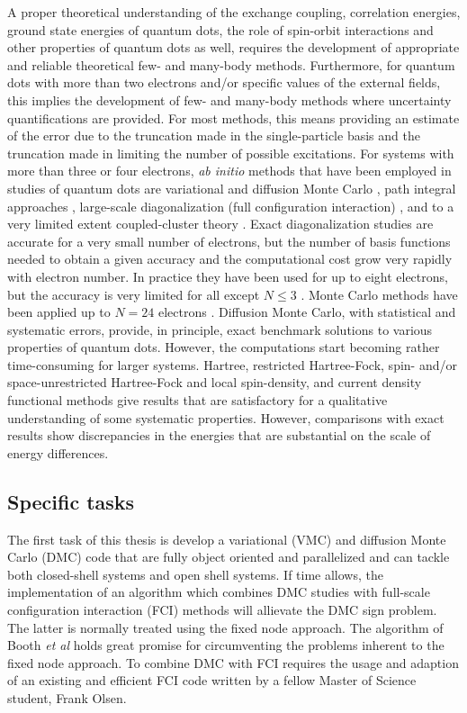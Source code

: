 \documentclass[twocolumn]{revtex4}
\begin{document}
A proper theoretical understanding of the exchange coupling,
correlation energies, ground state energies of quantum dots, the role
of spin-orbit interactions and other properties of quantum dots as
well, requires the development of appropriate and reliable theoretical
few- and many-body methods.  Furthermore, for quantum dots with more
than two electrons and/or specific values of the external fields, this
implies the development of few- and many-body methods where
uncertainty quantifications are provided.  For most methods, this
means providing an estimate of the error due to the truncation made in
the single-particle basis and the truncation made in limiting the
number of possible excitations.  For systems with more than three or
four electrons, {\em ab initio} methods that have been employed in
studies of quantum dots are variational and diffusion Monte Carlo
\cite{harju2005,pederiva2001, pederiva2003}, path integral approaches
\cite{pi1999}, large-scale diagonalization (full configuration
interaction) \cite{Eto97,Maksym90,simen2008,modena2000}, and to a very
limited extent coupled-cluster theory
\cite{shavittbartlett2009,bartlett2007,bartlett2003,indians}.  Exact
diagonalization studies are accurate for a very small number of
electrons, but the number of basis functions needed to obtain a given
accuracy and the computational cost grow very rapidly with electron
number.  In practice they have been used for up to eight
electrons\cite{Eto97,Maksym90,modena2000}, but the accuracy is very
limited for all except $N\le 3$ .  Monte Carlo methods have been
applied up to $N=24$ electrons
\cite{pederiva2001,pederiva2003}. Diffusion Monte Carlo, with
statistical and systematic errors, provide, in principle, exact
benchmark solutions to various properties of quantum dots. However,
the computations start becoming rather time-consuming for larger
systems.  Hartree\cite{Kum90}, restricted Hartree-Fock, spin- and/or
space-unrestricted Hartree-Fock\cite{Fuj96,Mul96,Yan99} and local
spin-density, and current density functional
methods\cite{Kos97,Hir99,finns1,finns2} give results that are
satisfactory for a qualitative understanding of some systematic
properties. However, comparisons with exact results show discrepancies
in the energies that are substantial on the scale of energy
differences.


\subsection*{Specific tasks}

The first task of this thesis is develop a variational (VMC) and diffusion Monte Carlo (DMC)
code that are fully object oriented and parallelized and can tackle
both closed-shell systems and open shell systems. If time allows, the
implementation of an algorithm which combines DMC studies with
full-scale configuration interaction (FCI) methods will allievate the
DMC sign problem. The latter is normally treated using the fixed node
approach. The algorithm of Booth {\em et al} \cite{booth2009} holds
great promise for circumventing the problems inherent to the fixed
node approach. To combine DMC with FCI requires the usage and adaption
of an existing and efficient FCI code written by a fellow Master of
Science student, Frank Olsen.
\end{document}
